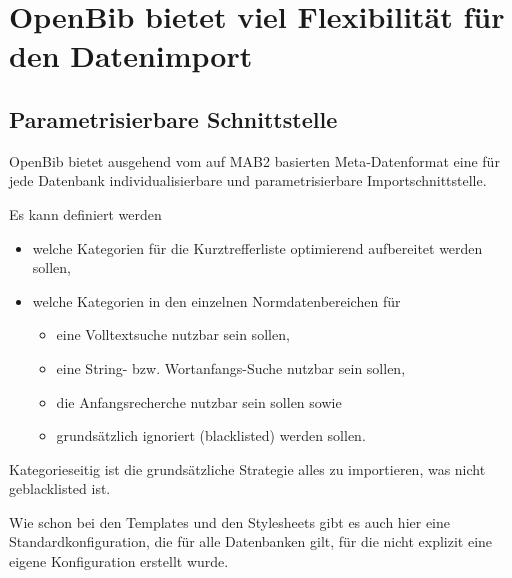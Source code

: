 \documentclass[11pt, twoside, a4paper, BCOR8mm, DIV12, bibtotoc,idxtotoc]{scrbook}
\begin{document}
\section{OpenBib bietet viel Flexibilität für den Datenimport }
\subsection{Parametrisierbare Schnittstelle}
OpenBib bietet ausgehend vom auf MAB2 basierten Meta-Datenformat eine
für jede Datenbank individualisierbare und parametrisierbare
Importschnittstelle.

Es kann definiert werden
\begin{itemize}
\item welche Kategorien für die Kurztrefferliste optimierend
  aufbereitet werden sollen,
\item welche Kategorien in den einzelnen Normdatenbereichen für
  \begin{itemize}
  \item eine Volltextsuche nutzbar sein sollen,
  \item eine String- bzw. Wortanfangs-Suche nutzbar sein sollen,
  \item die Anfangsrecherche nutzbar sein sollen sowie
  \item grundsätzlich ignoriert (blacklisted) werden sollen.
  \end{itemize}
\end{itemize}

Kategorieseitig ist die grundsätzliche Strategie alles zu
importieren, was nicht geblacklisted ist.

Wie schon bei den Templates und den Stylesheets gibt es auch hier
eine Standardkonfiguration, die für alle Datenbanken gilt, für die
nicht explizit eine eigene Konfiguration erstellt wurde.
\end{document}
